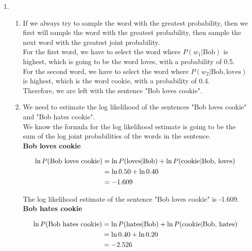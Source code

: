 \documentclass[12pt]{article}
\begin{document}
\begin{enumerate}
  \item
  \begin{enumerate}
    \item If we always try to sample the word with the greatest probability, then we first will sample the word with the greatest probability, then sample the next word with the greatest joint probability. \\ 
    
    For the first word, we have to select the word where $P(w_1 | \text{Bob})$ is highest, which is going to be the word loves, with a probability of 0.5. \\ 

    For the second word, we have to select the word where $P(w_2 | \text{Bob}, \text{loves})$ is highest, which is the word cookie, with a probability of 0.4. \\ 

    Therefore, we are left with the sentence "Bob loves cookie".
    \item We need to estimate the log likelihood of the sentences "Bob loves cookie" and "Bob hates cookie". \\ 

    We know the formula for the log likelihood estimate is going to be the sum of the log joint probabilities of the words in the sentence. \\ 

    \textbf{Bob loves cookie}

    \begin{align*}
      \ln P(\text{Bob loves cookie}) &= \ln P(\text{loves} | \text{Bob}) + \ln P(\text{cookie} | \text{Bob, loves}) \notag \\
      &= \ln 0.50 + \ln 0.40 \notag\\
      &= -1.609 \notag
    \end{align*}

    The log likelihood estimate of the sentence "Bob loves cookie" is -1.609. \\

    \textbf{Bob hates cookie}

    \begin{align*}
      \ln P(\text{Bob hates cookie}) &= \ln P(\text{hates} | \text{Bob}) + \ln P(\text{cookie} | \text{Bob, hates}) \notag \\
      &= \ln 0.40 + \ln 0.20 \notag\\
      &= -2.526 \notag
    \end{align*}


\end{enumerate}
\end{enumerate}
\end{document}
